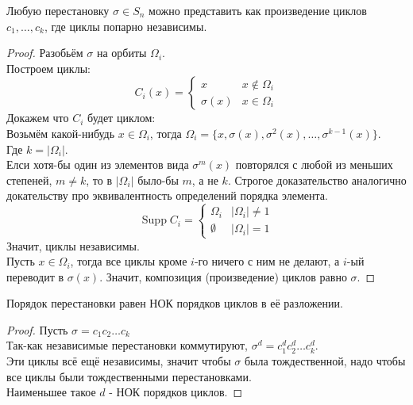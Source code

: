 \documentclass[11pt, oneside]{article}   	%
\DeclareMathOperator{\supp}{Supp}
\begin{document}
    \begin{theorem}
        Любую перестановку $\sigma\in S_n$ можно представить как произведение циклов $c_1, \ldots, c_k$, где циклы попарно независимы.
        \begin{proof}
            Разобьём $\sigma$ на орбиты $\Omega_i$.\\
            Построем циклы: 
            \begin{equation*}
                C_i(x) = 
                \begin{cases}
                    x & x \not\in \Omega_i\\
                    \sigma(x) & x\in \Omega_i
                \end{cases}
            \end{equation*}
            Докажем что $C_i$ будет циклом:\\
            Возьмём какой-нибудь $x\in \Omega_i$, тогда $\Omega_i = \{x, \sigma(x), \sigma^{2}(x), \ldots, \sigma^{k-1}(x)\} $.\\
            Где $k=|\Omega_i|$.\\
            Елси хотя-бы один из элементов вида $\sigma^{m}(x)$ повторялся с любой из меньших степеней, $m\neq k$, то в $|\Omega_i|$ было-бы $m$, а не $k$. Строгое доказательство аналогично докательству про эквивалентность определений порядка элемента.\\
            \begin{equation*}
                \supp C_i = 
                \begin{cases}
                    \Omega_i & |\Omega_i| \neq 1\\
                    \emptyset & |\Omega_i| = 1
                \end{cases}
            \end{equation*}
            Значит, циклы независимы.\\
            Пусть $x\in \Omega_i$, тогда все циклы кроме $i$-го ничего с ним не делают, а $i$-ый переводит в $\sigma(x)$. Значит, композиция (произведение) циклов равно $\sigma$.
        \end{proof}
    \end{theorem}
    \begin{theorem}
        Порядок перестановки равен НОК порядков циклов в её разложении.\\
        \begin{proof}
            Пусть $\sigma=c_1c_2\ldots c_k$\\
            Так-как независимые перестановки коммутируют, $\sigma^{d}=c_1^{d}c_2^{d}\ldots c_k^{d}$.\\
            Эти циклы всё ещё независимы, значит чтобы $\sigma$ была тождественной, надо чтобы все циклы были тождественными перестановками.\\
            Наименьшее такое $d$ - НОК порядков циклов.
        \end{proof}
    \end{theorem}
\end{document}
